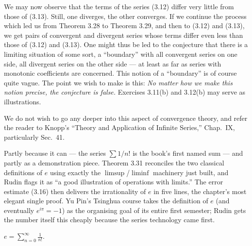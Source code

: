 We may now observe that the terms of the series (3.12) differ very little from
those of (3.13). Still, one diverges, the other converges. If we continue the
process which led us from Theorem 3.28 to Theorem 3.29, and then to (3.12) and
(3.13), we get pairs of convergent and divergent series whose terms differ even
less than those of (3.12) and (3.13). One might thus be led to the conjecture
that there is a limiting situation of some sort, a ``boundary'' with all
convergent series on one side, all divergent series on the other side --- at
least as far as series with monotonic coefficients are concerned. This notion
of a ``boundary'' is of course quite vague. The point we wish to make is this:
\emph{No matter how we make this notion precise, the conjecture is false.}
Exercises 3.11(b) and 3.12(b) may serve as illustrations.

We do not wish to go any deeper into this aspect of convergence theory, and
refer the reader to Knopp's ``Theory and Application of Infinite Series,''
Chap.\ IX, particularly Sec.\ 41.


\begin{signpost}
Partly because it can --- the series $\sum 1/n!$ is the book's first named sum
--- and partly as a demonstration piece. Theorem 3.31 reconciles the two
classical definitions of $e$ using exactly the $\limsup$/$\liminf$ machinery
just built, and Rudin flags it as ``a good illustration of operations with
limits.'' The error estimate (3.16) then delivers the irrationality of $e$ in
five lines, the chapter's most elegant single proof. Yu Pin's Tsinghua course
takes the definition of $e$ (and eventually $e^{i\pi} = -1$) as the organising
goal of its entire first semester; Rudin gets the number itself this cheaply
because the series technology came first.
\end{signpost}

$\displaystyle e = \sum_{n=0}^{\infty} \frac{1}{n!}$.

